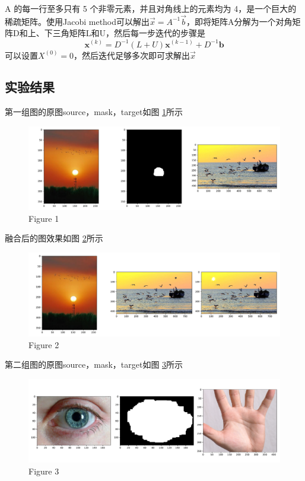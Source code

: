 \documentclass[a4paper]{article}
\begin{document}
A 的每一行至多只有 5 个非零元素，并且对角线上的元素均为 4，是一个巨大的稀疏矩阵。使用Jacobi method可以解出$\vec x = A^{-1} \vec b$，即将矩阵A分解为一个对角矩阵D和上、下三角矩阵L和U，然后每一步迭代的步骤是
$$
\mathbf { x } ^ { ( k ) } = D ^ { - 1 } ( L + U ) \mathbf { x } ^ { ( k - 1 ) } + D ^ { - 1 } \mathbf { b }
$$
可以设置$X^{(0)}=0$，然后迭代足够多次即可求解出$\vec x$

\subsection{实验结果}
第一组图的原图source，mask，target如图 \ref{fig:7}所示

\begin{figure}[htp]
\centering
\includegraphics[width=1\linewidth]{pictures/7.pdf}
\caption{Figure 1}
\label{fig:7}
\end{figure}

融合后的图效果如图 \ref{fig:8}所示
\begin{figure}[htp]
\centering
\includegraphics[width=1\linewidth]{pictures/8.pdf}
\caption{Figure 2}
\label{fig:8}
\end{figure}

第二组图的原图source，mask，target如图 \ref{fig:9}所示

\begin{figure}[htp]
\centering
\includegraphics[width=1\linewidth]{pictures/9.pdf}
\caption{Figure 3}
\label{fig:9}
\end{figure}
\end{document}
